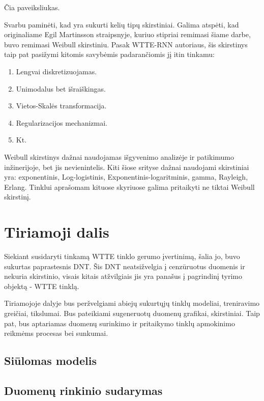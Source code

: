 \documentclass{VUMIFPSkursinis}
\begin{document}
Čia paveiksliukas.

Svarbu paminėti, kad yra sukurti kelių tipų skirstiniai. Galima atspėti, kad originaliame Egil Martinsson straipsnyje, kuriuo stipriai remimasi šiame darbe, buvo remimasi Weibull skirstiniu. Pasak WTTE-RNN autoriaus, šis skirstinys taip pat pasižymi kitomis savybėmis padarančiomis jį itin tinkamu:

\begin{enumerate}
  \item Lengvai diskretizuojamas.
  \item Unimodalus bet išraiškingas.
  \item Vietos-Skalės transformacija.
  \item Regularizacijos mechanizmai.
  \item Kt.
\end{enumerate}

Weibull skirstinys dažnai naudojamas išgyvenimo analizėje ir patikimumo inžinerijoje, bet jis nevienintelis. Kiti šiose srityse dažnai naudojami skirstiniai yra: exponentinis, Log-logistinis, Exponentinis-logaritminis, gamma, Rayleigh, Erlang. Tinklui aprašomam kituose skyriuose galima pritaikyti ne tiktai Weibull skirstinį.

\section{Tiriamoji dalis}

Siekiant susidaryti tinkamą WTTE tinklo gerumo įvertinimą, šalia jo, buvo sukurtas paprastesnis DNT. Šis DNT neatsižvelgia į cenzūruotus duomenis ir nekuria skirstinio, visais kitais atžvilgiais jis yra panašus į pagrindinį tyrimo objektą - WTTE tinklą.

Tiriamojoje dalyje bus peržvelgiami abiejų sukurtųjų tinklų modeliai, treniravimo greičiai, tikslumai. Bus pateikiami sugeneruotų duomenų grafikai, skirstiniai. Taip pat, bus aptariamas duomenų surinkimo ir pritaikymo tinklų apmokinimo reikmėms procesas bei sunkumai.


\subsection{Siūlomas modelis}



\subsection{Duomenų rinkinio sudarymas}
\end{document}
